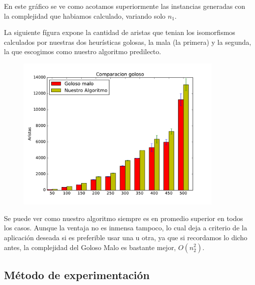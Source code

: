 En este gráfico se ve como acotamos superiormente las instancias generadas con la complejidad que habiamos calculado, variando solo $n_1$.

La siguiente fígura expone la cantidad de aristas que tenian los isomorfismos calculados por nuestras dos heurísticas golosas, la mala (la primera) y la segunda, la que escogimos como nuestro algoritmo predilecto.

\begin{figure}[H]
 \centering
	\includegraphics[width=0.9\textwidth]{graficos/problema_4/calidad.pdf}
	\caption{}
	\label{fig:problema4-4}
\end{figure}

Se puede ver como nuestro algoritmo siempre es en promedio superior en todos los casos. Aunque la ventaja no es  inmensa tampoco, lo cual deja a criterio de la aplicación deseada si es preferible usar una u otra, ya que si recordamos lo dicho antes, la complejidad del Goloso Malo es bastante mejor, $O(n_2^2)$.

\subsection{Método de experimentación}